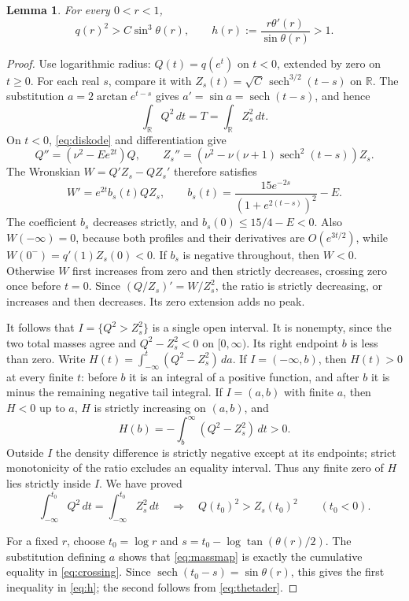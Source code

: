 \documentclass[11pt]{article}
\newtheorem{lemma}[theorem]{Lemma}
\newcommand{\R}{\mathbb R}
\newcommand{\dd}{\,d}
\DeclareMathOperator{\sech}{sech}
\begin{document}
\begin{lemma}\label{lem:radial}
For every $0<r<1$,
\begin{equation}\label{eq:h}
 q(r)^2>C\sin^3\theta(r),\qquad
 h(r):=\frac{r\theta'(r)}{\sin\theta(r)}>1.
\end{equation}
\end{lemma}
\begin{proof}
Use logarithmic radius: $Q(t)=q(e^t)$ on $t<0$, extended by zero on
$t\ge0$. For each real $s$, compare it with
$Z_s(t)=\sqrt C\,\sech^{3/2}(t-s)$ on $\R$.
The substitution $a=2\arctan e^{t-s}$ gives
$a'=\sin a=\sech(t-s)$, and hence
\[
 \int_\R Q^2\dd t=T=\int_\R Z_s^2\dd t.
\]
On $t<0$, \eqref{eq:diskode} and differentiation give
\[
 Q''=(\nu^2-Ee^{2t})Q,\qquad
 Z_s''=(\nu^2-\nu(\nu+1)\sech^2(t-s))Z_s.
\]
The Wronskian $W=Q'Z_s-QZ_s'$ therefore satisfies
\begin{equation}\label{eq:wronskian}
 W'=e^{2t}b_s(t)QZ_s,\qquad
 b_s(t)=\frac{15e^{-2s}}{(1+e^{2(t-s)})^2}-E.
\end{equation}
The coefficient $b_s$ decreases strictly, and
$b_s(0)\le15/4-E<0$.
Also $W(-\infty)=0$, because both profiles and their derivatives are
$O(e^{3t/2})$, while $W(0^-)=q'(1)Z_s(0)<0$.
If $b_s$ is negative throughout, then $W<0$. Otherwise $W$ first increases
from zero and then strictly decreases, crossing zero once before $t=0$.
Since $(Q/Z_s)'=W/Z_s^2$, the ratio is strictly decreasing, or increases
and then decreases. Its zero extension adds no peak.

It follows that $I=\{Q^2>Z_s^2\}$ is a single open interval. It is
nonempty, since the two total masses agree and $Q^2-Z_s^2<0$ on
$[0,\infty)$. Its right endpoint $b$ is less than zero.
Write $H(t)=\int_{-\infty}^t(Q^2-Z_s^2)\dd a$.
If $I=(-\infty,b)$, then $H(t)>0$ at every finite $t$: before $b$ it is
an integral of a positive function, and after $b$ it is minus the remaining
negative tail integral. If $I=(a,b)$ with finite $a$, then $H<0$ up to $a$,
$H$ is strictly increasing on $(a,b)$, and
\[
 H(b)=-\int_b^\infty(Q^2-Z_s^2)\dd t>0.
\]
Outside $I$ the density difference is strictly negative except at its
endpoints; strict monotonicity of the ratio excludes an equality interval.
Thus any finite zero of $H$ lies strictly inside $I$. We have proved
\begin{equation}\label{eq:crossing}
 \int_{-\infty}^{t_0}Q^2\dd t=
 \int_{-\infty}^{t_0}Z_s^2\dd t
 \quad\Longrightarrow\quad Q(t_0)^2>Z_s(t_0)^2
 \qquad(t_0<0).
\end{equation}

For a fixed $r$, choose $t_0=\log r$ and
$s=t_0-\log\tan(\theta(r)/2)$.
The substitution defining $a$ shows that \eqref{eq:massmap} is exactly
the cumulative equality in \eqref{eq:crossing}.
Since $\sech(t_0-s)=\sin\theta(r)$, this gives the first inequality in
\eqref{eq:h}; the second follows from \eqref{eq:thetader}.
\end{proof}
\end{document}
